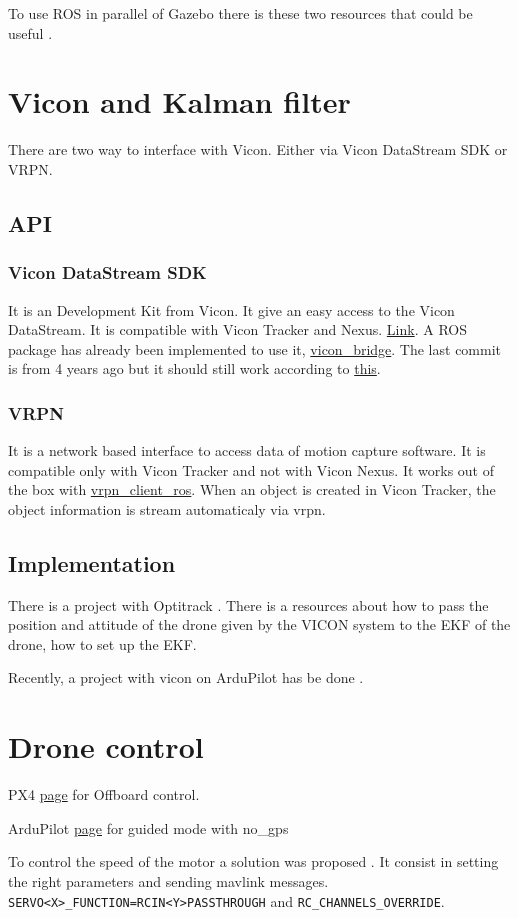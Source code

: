 To use ROS in parallel of Gazebo there is these two resources that could be useful \cite{youtube_gazebo_ros} \cite{github_gazebo_ros}.



\section{Vicon and Kalman filter}
There are two way to interface with Vicon. Either via Vicon DataStream SDK or VRPN.

\subsection{API}
\subsubsection{Vicon DataStream SDK}
It is an Development Kit from Vicon. It give an easy access to the Vicon DataStream. It is compatible with Vicon Tracker and Nexus. \href{https://www.vicon.com/downloads/utilities-and-sdk/datastream-sdk}{Link}. A ROS package has already been implemented to use it, \href{https://github.com/ethz-asl/vicon_bridge}{vicon\_bridge}.
The last commit is from 4 years ago but it should still work according to \href{https://answers.ros.org/question/329849/which-ros-package-use-with-vicon/}{this}.

\subsubsection{VRPN}
It is a network based interface to access data of motion capture software. It is compatible only with Vicon Tracker and not with Vicon Nexus. It works out of the box with \href{https://wiki.ros.org/vrpn_client_ros}{vrpn\_client\_ros}. When an object is created in Vicon Tracker, the object information is stream automaticaly via vrpn.

\subsection{Implementation}
There is a project with Optitrack \cite{ardupilot_optitrack}. There is a resources about how to pass the position and attitude of the drone given by the VICON system to the EKF of the drone, how to set up the EKF.

Recently, a project with vicon on ArduPilot has be done \cite{ardupilot_vicon}.

\section{Drone control}
PX4 \href{https://discuss.ardupilot.org/t/offboard-control/37869}{page} for Offboard control.

ArduPilot \href{http://ardupilot.org/copter/docs/ac2_guidedmode.html#guided-nogps}{page} for guided mode with no\_gps

To control the speed of the motor a solution was proposed \cite{github_ardupilot_11859}.
It consist in setting the right parameters and sending mavlink messages.
\texttt{SERVO<X>\_FUNCTION=RCIN<Y>PASSTHROUGH} and \texttt{RC\_CHANNELS\_OVERRIDE}.
